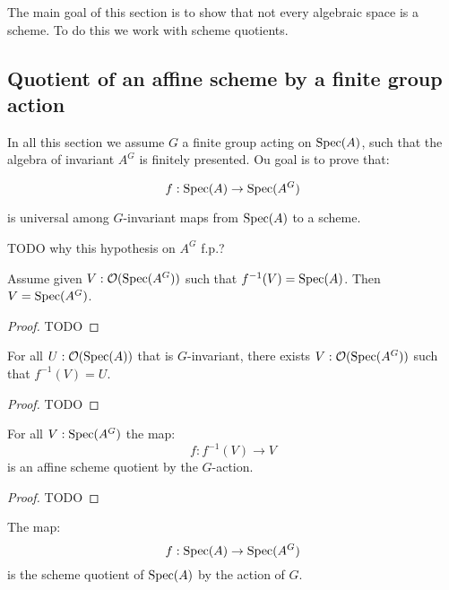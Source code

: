 The main goal of this section is to show that not every algebraic space is a scheme. To do this we work with scheme quotients.

\subsection{Quotient of an affine scheme by a finite group action}

In all this section we assume $G$ a finite group acting on $\operatorname{Spec}(A)$, such that the algebra of invariant $A^G$ is finitely presented. Ou goal is to prove that:

\[f:\operatorname{Spec}(A)\to \operatorname{Spec}(A^G)\] 

is universal among $G$-invariant maps from $\operatorname{Spec}(A)$ to a scheme.

\begin{remark}
TODO why this hypothesis on $A^G$ f.p.?
\end{remark}

\begin{lemma}\label{injective-on-open}
Assume given $V:\mathcal{O}(\operatorname{Spec}(A^G))$ such that $f^{-1}(V) = \operatorname{Spec}(A)$. Then $V=\operatorname{Spec}(A^G)$. 
\end{lemma}

\begin{proof}
TODO
\end{proof}

\begin{lemma}\label{surjective-on-open}
For all $U: \mathcal{O}(\operatorname{Spec}(A))$ that is $G$-invariant, there exists $V:\mathcal{O}(\operatorname{Spec}(A^G))$ such that $f^{-1}(V)=U$.
\end{lemma}

\begin{proof}
TODO
\end{proof}

\begin{lemma}\label{affine-scheme-quotient-on-open}
For all $V:\operatorname{Spec}(A^G)$ the map:
\[f : f^{-1}(V) \to V\]
is an affine scheme quotient by the $G$-action.
\end{lemma}

\begin{proof}
TODO
\end{proof}

\begin{proposition}
The map:
\[f:\operatorname{Spec}(A)\to \operatorname{Spec}(A^G)\] 
is the scheme quotient of $\operatorname{Spec}(A)$ by the action of $G$.
\end{proposition}


